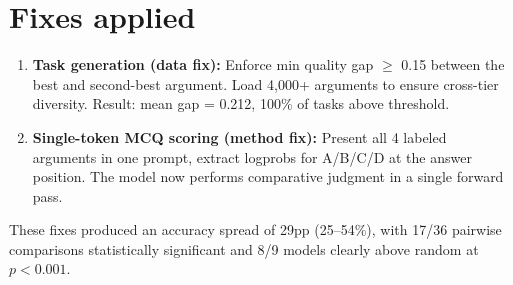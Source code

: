\documentclass[11pt,a4paper]{article}
\begin{document}
\section{Fixes applied}

\begin{enumerate}
\item \textbf{Task generation (data fix):} Enforce min quality gap $\geq$ 0.15 between the best and second-best argument. Load 4{,}000+ arguments to ensure cross-tier diversity. Result: mean gap = 0.212, 100\% of tasks above threshold.

\item \textbf{Single-token MCQ scoring (method fix):} Present all 4 labeled arguments in one prompt, extract logprobs for A/B/C/D at the answer position. The model now performs comparative judgment in a single forward pass.
\end{enumerate}

These fixes produced an accuracy spread of 29pp (25--54\%), with 17/36 pairwise comparisons statistically significant and 8/9 models clearly above random at $p < 0.001$.
\end{document}
